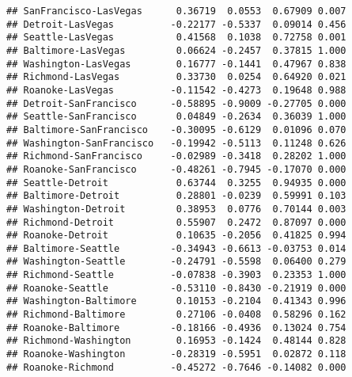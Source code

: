 \documentclass[
]{article}
\begin{document}
\begin{verbatim}
## SanFrancisco-LasVegas      0.36719  0.0553  0.67909 0.007
## Detroit-LasVegas          -0.22177 -0.5337  0.09014 0.456
## Seattle-LasVegas           0.41568  0.1038  0.72758 0.001
## Baltimore-LasVegas         0.06624 -0.2457  0.37815 1.000
## Washington-LasVegas        0.16777 -0.1441  0.47967 0.838
## Richmond-LasVegas          0.33730  0.0254  0.64920 0.021
## Roanoke-LasVegas          -0.11542 -0.4273  0.19648 0.988
## Detroit-SanFrancisco      -0.58895 -0.9009 -0.27705 0.000
## Seattle-SanFrancisco       0.04849 -0.2634  0.36039 1.000
## Baltimore-SanFrancisco    -0.30095 -0.6129  0.01096 0.070
## Washington-SanFrancisco   -0.19942 -0.5113  0.11248 0.626
## Richmond-SanFrancisco     -0.02989 -0.3418  0.28202 1.000
## Roanoke-SanFrancisco      -0.48261 -0.7945 -0.17070 0.000
## Seattle-Detroit            0.63744  0.3255  0.94935 0.000
## Baltimore-Detroit          0.28801 -0.0239  0.59991 0.103
## Washington-Detroit         0.38953  0.0776  0.70144 0.003
## Richmond-Detroit           0.55907  0.2472  0.87097 0.000
## Roanoke-Detroit            0.10635 -0.2056  0.41825 0.994
## Baltimore-Seattle         -0.34943 -0.6613 -0.03753 0.014
## Washington-Seattle        -0.24791 -0.5598  0.06400 0.279
## Richmond-Seattle          -0.07838 -0.3903  0.23353 1.000
## Roanoke-Seattle           -0.53110 -0.8430 -0.21919 0.000
## Washington-Baltimore       0.10153 -0.2104  0.41343 0.996
## Richmond-Baltimore         0.27106 -0.0408  0.58296 0.162
## Roanoke-Baltimore         -0.18166 -0.4936  0.13024 0.754
## Richmond-Washington        0.16953 -0.1424  0.48144 0.828
## Roanoke-Washington        -0.28319 -0.5951  0.02872 0.118
## Roanoke-Richmond          -0.45272 -0.7646 -0.14082 0.000
\end{verbatim}
\end{document}
